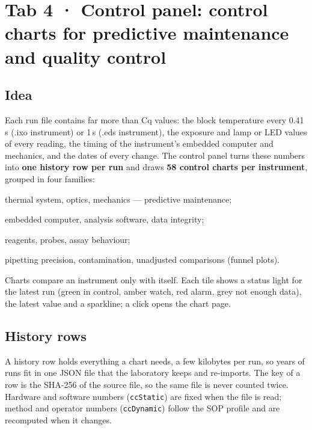 \chapter{Tab 4 · Control panel: control charts for predictive maintenance and quality control}\label{ch:panel}

\section{Idea}
Each run file contains far more than Cq values: the block temperature every 0.41\,s (.ixo instrument) or 1\,s (.eds instrument), the
exposure and lamp or LED values of every reading, the timing of the instrument's embedded computer and mechanics, and the
dates of every change. The control panel turns these numbers into \textbf{one history row per run} and draws
\textbf{58 control charts per instrument}, grouped in four families:

\begin{description}[leftmargin=2.6cm,style=nextline]
\item[1 · Hardware] thermal system, optics, mechanics — predictive maintenance;
\item[2 · Software] embedded computer, analysis software, data integrity;
\item[3 · Method] reagents, probes, assay behaviour;
\item[4 · Operator] pipetting precision, contamination, unadjusted comparisons (funnel plots).
\end{description}

Charts compare an instrument only with itself. Each tile shows a status light for the latest run (green in control, amber
watch, red alarm, grey not enough data), the latest value and a sparkline; a click opens the chart page.




\section{History rows}
A history row holds everything a chart needs, a few kilobytes per run, so years of runs fit in one JSON file that the
laboratory keeps and re-imports. The key of a row is the SHA-256 of the source file, so the same file is never counted twice.
Hardware and software numbers (\texttt{ccStatic}) are fixed when the file is read; method and operator numbers
(\texttt{ccDynamic}) follow the SOP profile and are recomputed when it changes.

